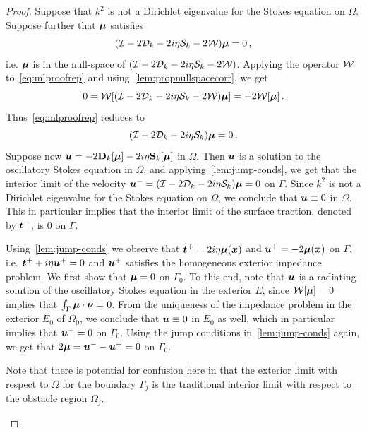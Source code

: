 \begin{proof}
  Suppose that $k^2$ is not a Dirichlet eigenvalue for the
  Stokes equation on $\Omega$. Suppose further that ${\boldsymbol \mu}$ satisfies
  \begin{equation}
    (\mathcal I - 2{\mathcal D}_{k} -2i\eta{\mathcal S}_{k} - 2{\mathcal W}) {\boldsymbol \mu} = 0 \, ,
    \label{eq:mlproofrep}
  \end{equation}
i.e. ${\boldsymbol \mu}$ is in the null-space
of $(\mathcal I - 2 {\mathcal D}_{k} - 2i\eta {\mathcal S}_{k} - 2 {\mathcal W})$. 
Applying the operator ${\mathcal W}$ to~\cref{eq:mlproofrep} and 
using~\cref{lem:propnullspacecorr}, we get
\begin{equation}
0 = {\mathcal W} [(\mathcal I - 2{\mathcal D}_{k} - 2i\eta{\mathcal S}_{k} - 2{\mathcal W}){\boldsymbol \mu}] = -2{\mathcal W} [{\boldsymbol \mu}] \, .
\end{equation}
Thus~\cref{eq:mlproofrep} reduces to
\begin{equation}
(\mathcal I - 2 {\mathcal D}_{k} - 2i\eta {\mathcal S}_{k}){\boldsymbol \mu} = 0\, .
\end{equation}
Suppose now ${\boldsymbol u} = -2{\bf D}_{k}[{\boldsymbol \mu}] -2i\eta{\bf S}_{k}[{\boldsymbol \mu}]$
in $\Omega$. Then ${\boldsymbol u}$ is a solution to the oscillatory
Stokes equation in $\Omega$, and applying~\cref{lem:jump-conds},
we get that the interior limit of the velocity
${\boldsymbol u}^{-} = (\mathcal I - 2{\mathcal D}_{k} -2i\eta{\mathcal S}_{k}) {\boldsymbol \mu} = 0$ on $\Gamma$.
Since $k^2$ is not a Dirichlet eigenvalue for the Stokes equation
on $\Omega$, we conclude that ${\boldsymbol u} \equiv 0$ in $\Omega$. 
This in particular implies that the interior limit of the
surface traction, denoted by ${\boldsymbol t}^{-}$, is $0$ on $\Gamma$.


Using~\cref{lem:jump-conds} we observe that ${\boldsymbol t}^{+}
= 2i\eta {\boldsymbol \mu}({\boldsymbol x})$ and ${\boldsymbol u}^{+} = -2{\boldsymbol \mu}({\boldsymbol x})$ on $\Gamma$, i.e.
${\boldsymbol t}^{+}+i\eta {\boldsymbol u}^{+}=0$ and ${\boldsymbol u}^{+}$ satisfies the homogeneous
exterior impedance problem.
We first show that ${\boldsymbol \mu}=0$ on $\Gamma_{0}$. 
To this end, note that ${\boldsymbol u}$ is a radiating solution
of the oscillatory Stokes equation in the exterior $E$,
since ${\mathcal W}[{\boldsymbol \mu}] = 0$ implies that $\int_{\Gamma} {\boldsymbol \mu}
\cdot {\boldsymbol \nu} = 0$. From the uniqueness of the impedance problem
in the exterior $E_0$ of $\Omega_0$, we conclude that
${\boldsymbol u} \equiv 0$ in $E_0$ as well, which in particular
implies that ${\boldsymbol u}^{+}=0$ on $\Gamma_{0}$.   
Using the jump conditions in~\cref{lem:jump-conds}
again, we get that
$2{\boldsymbol \mu} = {\boldsymbol u}^{-} - {\boldsymbol u}^{+} = 0$ on
$\Gamma_{0}$. 

\begin{remark}
  Note that there is potential for confusion here
  in that the exterior limit with respect to $\Omega$ 
  for the boundary $\Gamma_{j}$ is the traditional interior 
  limit with respect to the obstacle region $\Omega_{j}$.
\end{remark}


\end{proof}
